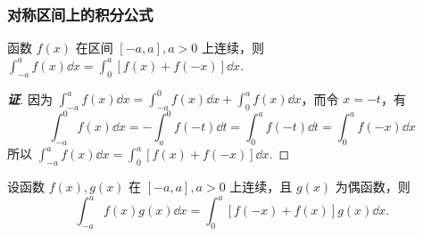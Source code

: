 \subsubsection{对称区间上的积分公式}
\begin{theorem}
    函数 $f(x)$ 在区间 $[-a,a],a>0$ 上连续，则 $\displaystyle \int_{-a}^{a}f(x)\dd x=\int_{0}^{a}[f(x)+f(-x)]\dd x.$
\end{theorem}
\begin{proof}[{\songti \textbf{证}}]
    因为 $\displaystyle\int_{-a}^{a}f(x)\dd x=\int_{-a}^{0}f(x)\dd x+\int_{0}^{a}f(x)\dd x$，而令 $x=-t$，有
    $$\int_{-a}^{0}f(x)\dd x=-\int_{a}^{0}f(-t)\dd t=\int_{0}^{a}f(-t)\dd t=\int_{0}^{a}f(-x)\dd x$$
    所以 $\displaystyle\int_{-a}^{a}f(x)\dd x=\int_{0}^{a}[f(x)+f(-x)]\dd x.$
\end{proof}
\begin{inference}
    \label{-aafgdx}
    设函数 $f(x),g(x)$ 在 $[-a,a],a>0$ 上连续，且 $g(x)$ 为偶函数，则 $$\displaystyle\int_{-a}^{a}f(x)g(x)\dd x=\int_{0}^{a}[f(-x)+f(x)]g(x)\dd x.$$
\end{inference}

